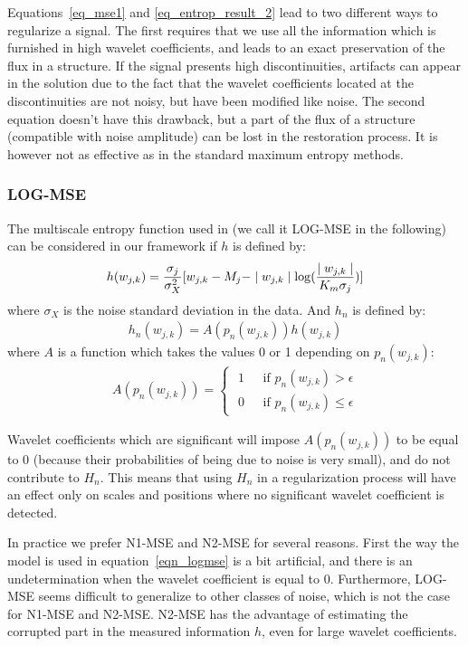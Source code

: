 Equations~\ref{eq_mse1} and  %
\ref{eq_entrop_result_2}
lead to two
different ways to regularize a signal. The first requires that we use
all the information which is furnished in high wavelet coefficients, and 
leads to an exact preservation of the flux in a structure. If the signal
presents high discontinuities, artifacts can appear in the solution 
due to the fact that the wavelet coefficients located at the discontinuities
are not noisy, but have been modified like noise. The second equation 
doesn't have this drawback, but a part of the flux of a structure
(compatible with noise amplitude) can be lost in the restoration process. 
It is however not as effective as in the standard maximum entropy methods.

\subsubsection{LOG-MSE}
The multiscale entropy function used in \cite{starck:pan96} (we call it LOG-MSE
in the following) can be considered in our framework if $h$ is defined by:
\begin{eqnarray}
h(w_{j,k}) = {\sigma_j \over \sigma_X^2} [w_{j,k} - M_j - 
       \mid w_{j,k} \mid \log( {\mid w_{j,k} \mid \over K_m \sigma_j})]
\label{eqn_logmse}
\end{eqnarray}
where $\sigma_X$ is the noise standard deviation in the data.
And $h_n$ is defined by:
\begin{eqnarray}
h_n(w_{j,k}) = A(p_n(w_{j,k})) h(w_{j,k})
\end{eqnarray}
where $A$ is a function which takes the values 0 or 1 depending on $p_n(w_{j,k})$:
\begin{eqnarray}
A(p_n(w_{j,k}))  = \left\{
  \begin{array}{ll}
  \mbox{ 1 } & \mbox{ if }  p_n(w_{j,k}) > \epsilon   \\
  \mbox{ 0 } & \mbox{ if }  p_n(w_{j,k}) \leq \epsilon
  \end{array}
  \right.
\label{eqn_mressupp}
\end{eqnarray}

Wavelet coefficients which are significant will impose $A(p_n(w_{j,k}))$ to
be equal to 0 (because    their probabilities of being due to noise is 
very small), and do not contribute to $H_n$. This means that using $H_n$ in
a regularization process will have an effect only on scales and positions
where no significant wavelet coefficient is detected.

In practice we prefer N1-MSE and N2-MSE for several reasons. First the way
the model is used in equation~\ref{eqn_logmse} is a bit artificial, and  
there is an undetermination when the wavelet coefficient is equal to 0.
Furthermore, LOG-MSE seems difficult to generalize to other classes of noise,
which is not the case for N1-MSE and N2-MSE. N2-MSE has the advantage of 
estimating the corrupted part in the measured information $h$, even for large
wavelet coefficients.


